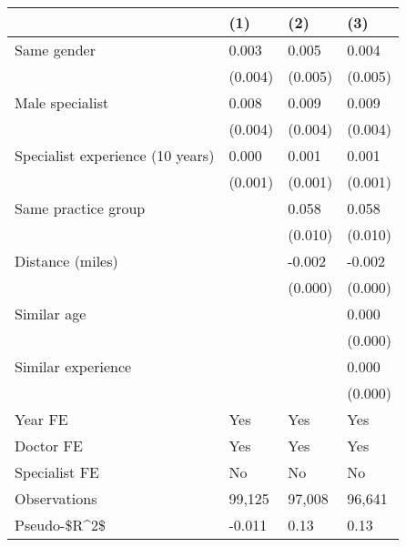 \begin{tabular}{llll}
\hline
& (1) & (2) & (3) \\ \hline
Same gender                        & 0.003   & 0.005   & 0.004   \\
& (0.004) & (0.005) & (0.005) \\
Male specialist                    & 0.008   & 0.009   & 0.009   \\
& (0.004) & (0.004) & (0.004) \\
Specialist experience (10 years)   & 0.000   & 0.001   & 0.001   \\
& (0.001) & (0.001) & (0.001) \\
Same practice group                &         & 0.058   & 0.058   \\
&         & (0.010) & (0.010) \\
Distance (miles)                   &         & -0.002  & -0.002  \\
&         & (0.000) & (0.000) \\
Similar age                        &         &         & 0.000   \\
&         &         & (0.000) \\
Similar experience                 &         &         & 0.000   \\
&         &         & (0.000) \\
Year FE                            & Yes     & Yes     & Yes     \\
Doctor FE                          & Yes     & Yes     & Yes     \\
Specialist FE                      & No      & No      & No      \\
Observations                       & 99,125  & 97,008  & 96,641  \\
Pseudo-\$R\textasciicircum{}2\$ & -0.011  & 0.13    & 0.13    \\
\hline
\end{tabular}
